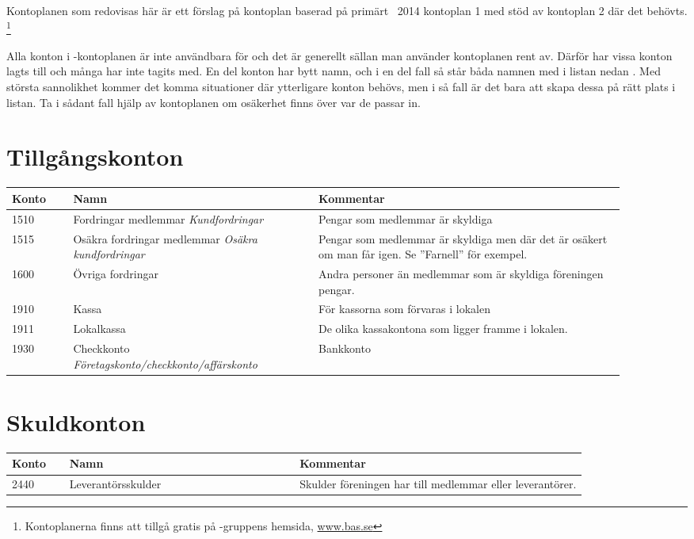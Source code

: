 Kontoplanen som redovisas här är ett förslag på kontoplan baserad på primärt ~2014 kontoplan 1 med stöd av kontoplan 2 där det behövts. \footnote{Kontoplanerna finns att tillgå gratis på -gruppens hemsida, \url{www.bas.se}}

Alla konton i -kontoplanen är inte användbara för  och det är generellt sällan man använder kontoplanen rent av. 
Därför har vissa konton lagts till och många har inte tagits med. En del konton har bytt namn, och i en del fall så står båda namnen med i listan nedan . Med största sannolikhet kommer det komma situationer där ytterligare konton behövs, men i så fall är det bara att skapa dessa på rätt plats i listan. Ta i sådant fall hjälp av  kontoplanen om osäkerhet finns över var de passar in.


\section{Tillgångskonton}
\begin{minipage}{\fullwidthlength}
	\begin{longtable}[l]{l p{0.4\linewidth} p{0.5\linewidth}}
		Konto	&	Namn								& Kommentar \\ \toprule \endhead
		1510	&	Fordringar medlemmar \newline \emph{Kundfordringar} & Pengar som medlemmar är skyldiga \acr{eta}\\
		1515	&	Osäkra fordringar medlemmar \newline \emph{Osäkra kundfordringar}	& Pengar som medlemmar är skyldiga men där det är osäkert om man får igen. \newline Se ”Farnell” för exempel.\\
		1600	&	Övriga fordringar					& Andra personer än medlemmar som är skyldiga föreningen pengar.\\
		1910	&	Kassa								& För kassorna som förvaras i lokalen\\
		1911	&	Lokalkassa							& De olika kassakontona som ligger framme i lokalen.\\
		1930	&	Checkkonto \newline \emph{Företagskonto/checkkonto/affärskonto}	& Bankkonto\\
	\end{longtable}
\end{minipage}

\section{Skuldkonton}
\begin{minipage}{\fullwidthlength}
	\begin{longtable}[l]{l p{0.4\linewidth} p{0.5\linewidth}}
		Konto	&	Namn								& Kommentar \\ \toprule \endhead
		2440	&	Leverantörsskulder					& Skulder föreningen har till medlemmar eller leverantörer.
	\end{longtable}
\end{minipage}

